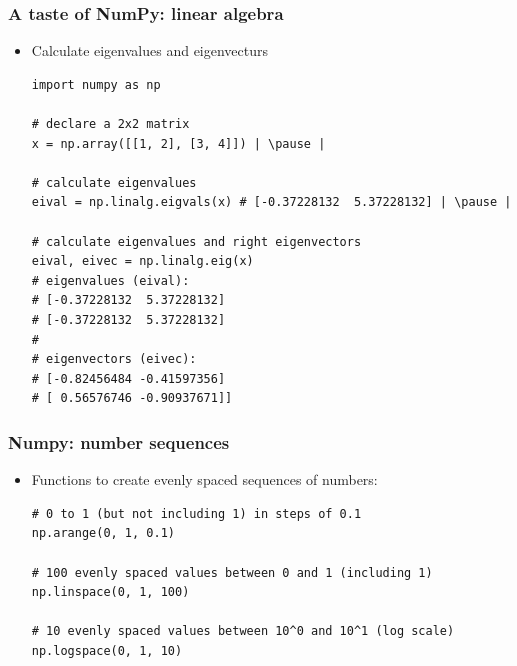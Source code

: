 \documentclass[xcolor=table]{beamer}
\begin{document}
\begin{frame}[fragile]
\frametitle{A taste of NumPy: linear algebra}
    \begin{itemize}
        \item Calculate eigenvalues and eigenvecturs
\begin{lstlisting}[style=python]
import numpy as np

# declare a 2x2 matrix
x = np.array([[1, 2], [3, 4]]) | \pause |

# calculate eigenvalues
eival = np.linalg.eigvals(x) # [-0.37228132  5.37228132] | \pause |

# calculate eigenvalues and right eigenvectors
eival, eivec = np.linalg.eig(x) 
# eigenvalues (eival): 
# [-0.37228132  5.37228132]
# [-0.37228132  5.37228132]
#
# eigenvectors (eivec):
# [-0.82456484 -0.41597356]
# [ 0.56576746 -0.90937671]]
\end{lstlisting}
    \end{itemize}
\end{frame}

\begin{frame}[fragile]
\frametitle{Numpy: number sequences}
    \begin{itemize} 
        \item Functions to create evenly spaced sequences of numbers:
\begin{lstlisting}[style=python]
# 0 to 1 (but not including 1) in steps of 0.1
np.arange(0, 1, 0.1) 

# 100 evenly spaced values between 0 and 1 (including 1)
np.linspace(0, 1, 100) 

# 10 evenly spaced values between 10^0 and 10^1 (log scale)
np.logspace(0, 1, 10) 
\end{lstlisting}
    \end{itemize}
\end{frame}
\end{document}
